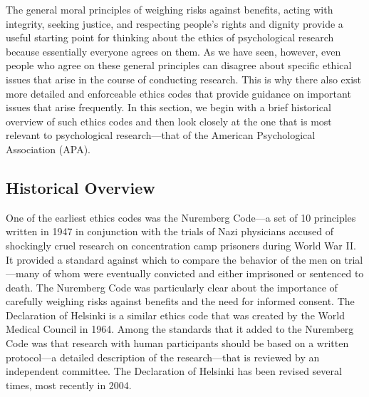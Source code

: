 The general moral principles of weighing risks against benefits, acting with integrity, seeking justice, and respecting people's rights and dignity provide a useful starting point for thinking about the ethics of psychological research because essentially everyone agrees on them. As we have seen, however, even people who agree on these general principles can disagree about specific ethical issues that arise in the course of conducting research. This is why there also exist more detailed and enforceable ethics codes that provide guidance on important issues that arise frequently. In this section, we begin with a brief historical overview of such ethics codes and then look closely at the one that is most relevant to psychological research---that of the American Psychological Association (APA).

\subsection{Historical Overview}

One of the earliest ethics codes was the Nuremberg Code---a set of 10 principles written in 1947 in conjunction with the trials of Nazi physicians accused of shockingly cruel research on concentration camp prisoners during World War II. It provided a standard against which to compare the behavior of the men on trial---many of whom were eventually convicted and either imprisoned or sentenced to death. The Nuremberg Code was particularly clear about the importance of carefully weighing risks against benefits and the need for informed consent. The Declaration of Helsinki is a similar ethics code that was created by the World Medical Council in 1964. Among the standards that it added to the Nuremberg Code was that research with human participants should be based on a written protocol---a detailed description of the research---that is reviewed by an independent committee. The Declaration of Helsinki has been revised several times, most recently in 2004.

